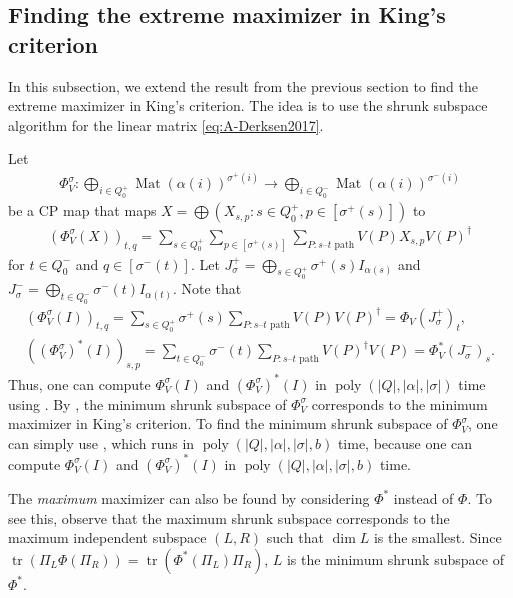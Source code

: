\documentclass[a4paper,11pt]{article}
\numberwithin{equation}{section}
\DeclareMathOperator{\Mat}{Mat}
\DeclareMathOperator{\tr}{tr}
\DeclareMathOperator{\poly}{poly}
\begin{document}
\subsection{Finding the extreme maximizer in King's criterion}
In this subsection, we extend the result from the previous section to find the extreme maximizer in King's criterion.
The idea is to use the shrunk subspace algorithm for the linear matrix \eqref{eq:A-Derksen2017}.

Let 
\begin{align}
    \Phi_V^\sigma: \bigoplus_{i \in Q_0^+} {\Mat(\alpha(i))}^{\sigma^+(i)} \to \bigoplus_{i \in Q_0^-} {\Mat(\alpha(i))}^{\sigma^-(i)}
\end{align}
be a CP map that maps $X = \bigoplus(X_{s,p} : s \in Q_0^+, p \in [\sigma^+(s)])$ to 
\begin{align}
    (\Phi_V^\sigma(X))_{t,q} = \sum_{s \in Q_0^+}\sum_{p \in [\sigma^+(s)]} \sum_{P: \text{$s$--$t$ path}} V(P) X_{s,p} V(P)^\dagger
\end{align}
for $t \in Q_0^-$ and $q \in [\sigma^-(t)]$.
Let  $J^+_\sigma = \bigoplus_{s \in Q_0^+} \sigma^+(s) I_{\alpha(s)}$ and $J^-_\sigma = \bigoplus_{t \in Q_0^-} \sigma^-(t) I_{\alpha(t)}$.
Note that
\begin{align}
    (\Phi_V^\sigma(I))_{t,q} = \sum_{s \in Q_0^+} \sigma^+(s) \sum_{P: \text{$s$--$t$ path}} V(P) V(P)^\dagger = \Phi_V(J^+_\sigma)_t, \\
    ((\Phi_V^\sigma)^*(I))_{s,p} = \sum_{t \in Q_0^-} \sigma^-(t) \sum_{P: \text{$s$--$t$ path}} V(P)^\dagger V(P) = \Phi_V^*(J^-_\sigma)_s.
\end{align}
Thus, one can compute $\Phi_V^\sigma(I)$ and $(\Phi_V^\sigma)^*(I)$ in $\poly(|Q|, |\alpha|, |\sigma|)$ time using .
By , the minimum shrunk subspace of $\Phi_V^\sigma$ corresponds to the minimum maximizer in King's criterion.
To find the minimum shrunk subspace of $\Phi_V^\sigma$, one can simply use , which runs in $\poly(|Q|, |\alpha|, |\sigma|, b)$ time, because one can compute $\Phi_V^\sigma(I)$ and $(\Phi_V^\sigma)^*(I)$ in $\poly(|Q|, |\alpha|, |\sigma|, b)$ time.

The \emph{maximum} maximizer can also be found by considering $\Phi^*$ instead of $\Phi$.
To see this, observe that the maximum shrunk subspace corresponds to the maximum independent subspace $(L, R)$ such that $\dim L$ is the smallest.
Since $\tr(\Pi_L \Phi(\Pi_R)) = \tr(\Phi^*(\Pi_L)\Pi_R)$, $L$ is the minimum shrunk subspace of $\Phi^*$.
\end{document}
